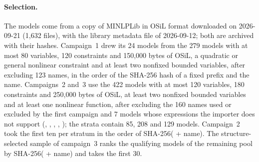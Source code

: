 \paragraph{Selection.}
The models come from a copy of MINLPLib \citep{BussieckDrudMeeraus2003,Vigerske2026MINLPLib}
in OSiL format downloaded on 2026-09-21 (1{,}632 files), with the library
metadata file of 2026-09-12; both are archived with their hashes. Campaign~1
drew its 24 models from the 279 models with at most 80 variables, 120
constraints and 150{,}000 bytes of OSiL, a quadratic or general nonlinear
constraint and at least two nonfixed bounded variables, after excluding 123
names, in the order of the SHA-256 hash of a fixed prefix and the name.
Campaigns~2 and~3 use the 422 models with at most 120 variables, 180
constraints and 250{,}000 bytes of OSiL, at least two nonfixed bounded
variables and at least one nonlinear function, after excluding the 160 names
used or excluded by the first campaign and 7 models whose expressions the
importer does not support (, , ,
, ); the strata contain 85, 208 and 129 models.
Campaign~2 took the first ten per stratum in the order of
SHA-256( + name). The structure-selected
sample of campaign~3 ranks the qualifying models of the remaining pool by
SHA-256( + name) and takes the first 30.



